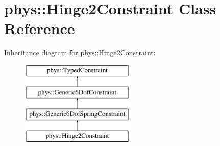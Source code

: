 \hypertarget{classphys_1_1Hinge2Constraint}{
\section{phys::Hinge2Constraint Class Reference}
\label{d2/d16/classphys_1_1Hinge2Constraint}
}
Inheritance diagram for phys::Hinge2Constraint:\begin{figure}[H]
\begin{center}
\leavevmode
\includegraphics[height=4cm]{d2/d16/classphys_1_1Hinge2Constraint}
\end{center}
\end{figure}

